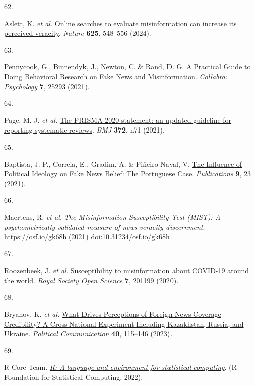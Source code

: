 \documentclass[
  man]{apa6}
\newlength{\cslhangindent}
\newlength{\csllabelwidth}
\newenvironment{CSLReferences}[2] %
 {\begin{list}{}{%
  \setlength{\itemindent}{0pt}
  \setlength{\leftmargin}{0pt}
  \setlength{\parsep}{0pt}
  \ifodd #1
   \setlength{\leftmargin}{\cslhangindent}
   \setlength{\itemindent}{-1\cslhangindent}
  \fi
  \setlength{\itemsep}{#2\baselineskip}}}
 {\end{list}}
\newcommand{\CSLLeftMargin}[1]{\parbox[t]{\csllabelwidth}{\strut#1\strut}}
\newcommand{\CSLRightInline}[1]{\parbox[t]{\linewidth - \csllabelwidth}{\strut#1\strut}}
\begin{document}
\begin{CSLReferences}{0}{0}
\CSLLeftMargin{62. }%
\CSLRightInline{*Aslett, K. \emph{et al.} \href{https://doi.org/10.1038/s41586-023-06883-y}{Online searches to evaluate misinformation can increase its perceived veracity}. \emph{Nature} \textbf{625}, 548--556 (2024).}

\CSLLeftMargin{63. }%
\CSLRightInline{*Pennycook, G., Binnendyk, J., Newton, C. \& Rand, D. G. \href{https://doi.org/10.1525/collabra.25293}{A Practical Guide to Doing Behavioral Research on Fake News and Misinformation}. \emph{Collabra: Psychology} \textbf{7}, 25293 (2021).}

\CSLLeftMargin{64. }%
\CSLRightInline{Page, M. J. \emph{et al.} \href{https://doi.org/10.1136/bmj.n71}{The PRISMA 2020 statement: an updated guideline for reporting systematic reviews}. \emph{BMJ} \textbf{372}, n71 (2021).}

\CSLLeftMargin{65. }%
\CSLRightInline{Baptista, J. P., Correia, E., Gradim, A. \& Piñeiro-Naval, V. \href{https://doi.org/10.3390/publications9020023}{The Influence of Political Ideology on Fake News Belief: The Portuguese Case}. \emph{Publications} \textbf{9}, 23 (2021).}

\CSLLeftMargin{66. }%
\CSLRightInline{*Maertens, R. \emph{et al.} \emph{The Misinformation Susceptibility Test (MIST): A psychometrically validated measure of news veracity discernment}. \url{https://osf.io/gk68h} (2021) doi:\href{https://doi.org/10.31234/osf.io/gk68h}{10.31234/osf.io/gk68h}.}

\CSLLeftMargin{67. }%
\CSLRightInline{*Roozenbeek, J. \emph{et al.} \href{https://doi.org/10.1098/rsos.201199}{Susceptibility to misinformation about COVID-19 around the world}. \emph{Royal Society Open Science} \textbf{7}, 201199 (2020).}

\CSLLeftMargin{68. }%
\CSLRightInline{*Bryanov, K. \emph{et al.} \href{https://doi.org/10.1080/10584609.2023.2172492}{What Drives Perceptions of Foreign News Coverage Credibility? A Cross-National Experiment Including Kazakhstan, Russia, and Ukraine}. \emph{Political Communication} \textbf{40}, 115--146 (2023).}

\CSLLeftMargin{69. }%
\CSLRightInline{R Core Team. \emph{\href{https://www.R-project.org/}{R: A language and environment for statistical computing}}. (R Foundation for Statistical Computing, 2022).}


\end{CSLReferences}
\end{document}
